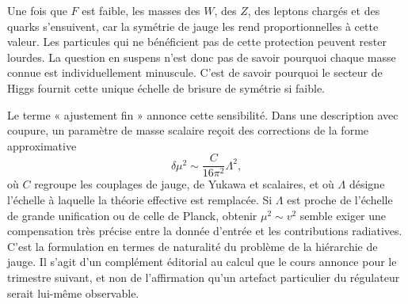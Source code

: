 Une fois que \(F\) est faible, les masses des \(W\), des \(Z\), des leptons chargés et des quarks s’ensuivent, car la symétrie de jauge les rend proportionnelles à cette valeur. Les particules qui ne bénéficient pas de cette protection peuvent rester lourdes. La question en suspens n’est donc pas de savoir pourquoi chaque masse connue est individuellement minuscule. C’est de savoir pourquoi le secteur de Higgs fournit cette unique échelle de brisure de symétrie si faible.

\begin{classroomqa}
\end{classroomqa}

Le terme « ajustement fin » annonce cette sensibilité. Dans une description avec coupure, un paramètre de masse scalaire reçoit des corrections de la forme approximative
\begin{equation}
  \delta\mu^2
  \sim
  \frac{C}{16\pi^2}\Lambda^2,
  \label{eq:l10-higgs-quadratic-sensitivity}
\end{equation}
où \(C\) regroupe les couplages de jauge, de Yukawa et scalaires, et où \(\Lambda\) désigne l’échelle à laquelle la théorie effective est remplacée. Si \(\Lambda\) est proche de l’échelle de grande unification ou de celle de Planck, obtenir \(\mu^2\sim v^2\) semble exiger une compensation très précise entre la donnée d’entrée et les contributions radiatives. C’est la formulation en termes de naturalité du problème de la hiérarchie de jauge. Il s’agit d’un complément éditorial au calcul que le cours annonce pour le trimestre suivant, et non de l’affirmation qu’un artefact particulier du régulateur serait lui-même observable.

\begin{classroomqa}
\end{classroomqa}

